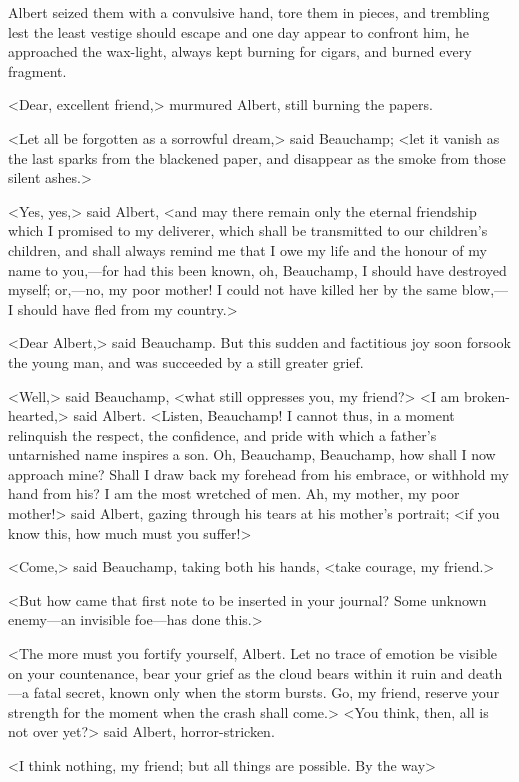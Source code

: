  Albert seized them with a convulsive hand, tore them in pieces, and trembling lest the least vestige should escape and one day appear to confront him, he approached the wax-light, always kept burning for cigars, and burned every fragment. 

 <Dear, excellent friend,> murmured Albert, still burning the papers. 

 <Let all be forgotten as a sorrowful dream,> said Beauchamp; <let it vanish as the last sparks from the blackened paper, and disappear as the smoke from those silent ashes.> 

 <Yes, yes,> said Albert, <and may there remain only the eternal friendship which I promised to my deliverer, which shall be transmitted to our children's children, and shall always remind me that I owe my life and the honour of my name to you,—for had this been known, oh, Beauchamp, I should have destroyed myself; or,—no, my poor mother! I could not have killed her by the same blow,—I should have fled from my country.> 

 <Dear Albert,> said Beauchamp. But this sudden and factitious joy soon forsook the young man, and was succeeded by a still greater grief. 

 <Well,> said Beauchamp, <what still oppresses you, my friend?>  <I am broken-hearted,> said Albert. <Listen, Beauchamp! I cannot thus, in a moment relinquish the respect, the confidence, and pride with which a father's untarnished name inspires a son. Oh, Beauchamp, Beauchamp, how shall I now approach mine? Shall I draw back my forehead from his embrace, or withhold my hand from his? I am the most wretched of men. Ah, my mother, my poor mother!> said Albert, gazing through his tears at his mother's portrait; <if you know this, how much must you suffer!> 

 <Come,> said Beauchamp, taking both his hands, <take courage, my friend.> 

 <But how came that first note to be inserted in your journal? Some unknown enemy—an invisible foe—has done this.> 

 <The more must you fortify yourself, Albert. Let no trace of emotion be visible on your countenance, bear your grief as the cloud bears within it ruin and death—a fatal secret, known only when the storm bursts. Go, my friend, reserve your strength for the moment when the crash shall come.>  <You think, then, all is not over yet?> said Albert, horror-stricken. 

 <I think nothing, my friend; but all things are possible. By the way\longdash> 

